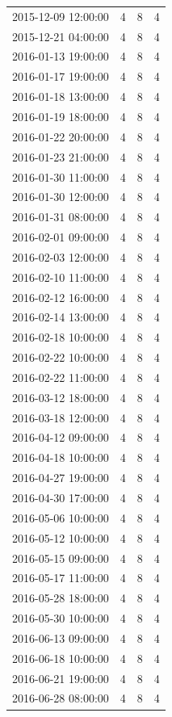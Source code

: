 \begin{tabular}{lrrr}
2015-12-09 12:00:00 & 4 & 8 & 4 \\
2015-12-21 04:00:00 & 4 & 8 & 4 \\
2016-01-13 19:00:00 & 4 & 8 & 4 \\
2016-01-17 19:00:00 & 4 & 8 & 4 \\
2016-01-18 13:00:00 & 4 & 8 & 4 \\
2016-01-19 18:00:00 & 4 & 8 & 4 \\
2016-01-22 20:00:00 & 4 & 8 & 4 \\
2016-01-23 21:00:00 & 4 & 8 & 4 \\
2016-01-30 11:00:00 & 4 & 8 & 4 \\
2016-01-30 12:00:00 & 4 & 8 & 4 \\
2016-01-31 08:00:00 & 4 & 8 & 4 \\
2016-02-01 09:00:00 & 4 & 8 & 4 \\
2016-02-03 12:00:00 & 4 & 8 & 4 \\
2016-02-10 11:00:00 & 4 & 8 & 4 \\
2016-02-12 16:00:00 & 4 & 8 & 4 \\
2016-02-14 13:00:00 & 4 & 8 & 4 \\
2016-02-18 10:00:00 & 4 & 8 & 4 \\
2016-02-22 10:00:00 & 4 & 8 & 4 \\
2016-02-22 11:00:00 & 4 & 8 & 4 \\
2016-03-12 18:00:00 & 4 & 8 & 4 \\
2016-03-18 12:00:00 & 4 & 8 & 4 \\
2016-04-12 09:00:00 & 4 & 8 & 4 \\
2016-04-18 10:00:00 & 4 & 8 & 4 \\
2016-04-27 19:00:00 & 4 & 8 & 4 \\
2016-04-30 17:00:00 & 4 & 8 & 4 \\
2016-05-06 10:00:00 & 4 & 8 & 4 \\
2016-05-12 10:00:00 & 4 & 8 & 4 \\
2016-05-15 09:00:00 & 4 & 8 & 4 \\
2016-05-17 11:00:00 & 4 & 8 & 4 \\
2016-05-28 18:00:00 & 4 & 8 & 4 \\
2016-05-30 10:00:00 & 4 & 8 & 4 \\
2016-06-13 09:00:00 & 4 & 8 & 4 \\
2016-06-18 10:00:00 & 4 & 8 & 4 \\
2016-06-21 19:00:00 & 4 & 8 & 4 \\
2016-06-28 08:00:00 & 4 & 8 & 4 \\

\end{tabular}
